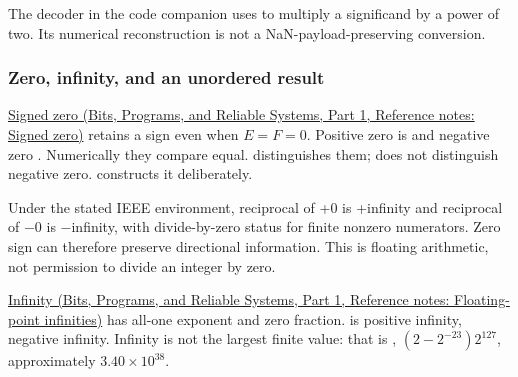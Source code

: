 The decoder in the code companion uses  to multiply a significand by a power of two. Its numerical reconstruction is not a NaN-payload-preserving conversion.

\subsubsection{Zero, infinity, and an unordered result}\label{05-engine-i-ch001-zero-infinity-and-an-unordered-result}

\hypertarget{05-engine-i-ch001-zero-infinity-and-an-unordered-result}{}

\href{../01-Bits-Programs-and-Reliable-Systems-P01/main.pdf\#appendix-3a048f032c1f}{Signed zero (Bits, Programs, and Reliable Systems, Part 1, Reference notes: Signed zero)} retains a sign even when \(E=F=0\). Positive zero is  and negative zero . Numerically they compare equal.  distinguishes them;  does not distinguish negative zero.  constructs it deliberately.

Under the stated IEEE environment, reciprocal of +0 is +infinity and reciprocal of −0 is −infinity, with divide-by-zero status for finite nonzero numerators. Zero sign can therefore preserve directional information. This is floating arithmetic, not permission to divide an integer by zero.

\href{../01-Bits-Programs-and-Reliable-Systems-P01/main.pdf\#appendix-eb336149c00a}{Infinity (Bits, Programs, and Reliable Systems, Part 1, Reference notes: Floating-point infinities)} has all-one exponent and zero fraction.  is positive infinity,  negative infinity. Infinity is not the largest finite value: that is , \((2-2^{-23})2^{127}\), approximately \(3.40\times10^{38}\).

